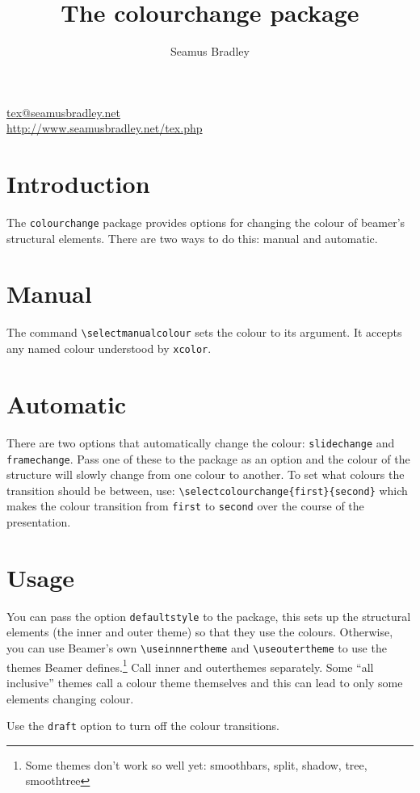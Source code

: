 \documentclass{scrartcl}
\author{Seamus Bradley}
\title{The colourchange package}
\begin{document}
\maketitle

\begin{center}
  \small \url{tex@seamusbradley.net}\\
  \url{http://www.seamusbradley.net/tex.php}
\end{center}

\section{Introduction}

The \lstinline+colourchange+ package provides options for changing the colour of beamer's structural elements.
There are two ways to do this: manual and automatic.

\section{Manual}

The command \lstinline+\selectmanualcolour+ sets the colour to its argument.
It accepts any named colour understood by \lstinline+xcolor+.

\section{Automatic}

There are two options that automatically change the colour: \lstinline+slidechange+ and \lstinline+framechange+.
Pass one of these to the package as an option and the colour of the structure will slowly change from one colour to another.
To set what colours the transition should be between, use: \lstinline+\selectcolourchange{first}{second}+ which makes the colour transition from
  \lstinline+first+ to \lstinline+second+ over the course of the presentation.

\section{Usage}

You can pass the option \lstinline+defaultstyle+ to the package, this sets up the structural elements (the inner and outer theme) so that they use the colours.
Otherwise, you can use Beamer's own \lstinline+\useinnnertheme+ and \lstinline+\useoutertheme+ to use the themes Beamer defines.\footnote{%
  Some themes don't work so well yet: smoothbars, split, shadow, tree, smoothtree}
Call inner and outerthemes separately.
Some ``all inclusive'' themes call a colour theme themselves and this can lead to only some elements changing colour.

Use the \lstinline+draft+ option to turn off the colour transitions.
\end{document}
